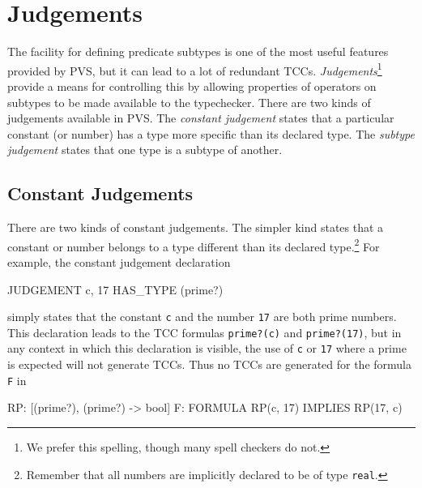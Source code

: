 \section{Judgements}
\label{judgements}

The facility for defining predicate subtypes is one of the most useful
features provided by PVS, but it can lead to a lot of redundant TCCs.
\emph{Judgements}\footnote{We prefer this spelling, though many spell
checkers do not.} provide a means for controlling this by allowing
properties of operators on subtypes to be made available to the
typechecker.  There are two kinds of judgements available in PVS\@.  The
\emph{constant judgement} states that a
particular constant (or number) has a type more specific than its declared
type.  The \emph{subtype judgement} states that
one type is a subtype of another.

\subsection{Constant Judgements}

There are two kinds of constant judgements.  The simpler kind 
states that a constant or number belongs to a type different than its
declared type.\footnote{Remember that all numbers are implicitly declared to
be of type \texttt{real}.}  For example, the constant judgement
declaration
\begin{pvsex}
  JUDGEMENT c, 17 HAS_TYPE (prime?)
\end{pvsex}
simply states that the constant \texttt{c} and the number \texttt{17} are
both prime numbers.  This declaration leads to the TCC formulas
\texttt{prime?(c)} and \texttt{prime?(17)}, but in any context in which
this declaration is visible, the use of \texttt{c} or \texttt{17} where a
prime is expected will not generate TCCs.  Thus no TCCs are generated for
the formula \texttt{F} in
\begin{pvsex}
  RP: [(prime?), (prime?) -> bool]
  F: FORMULA RP(c, 17) IMPLIES RP(17, c)
\end{pvsex}

